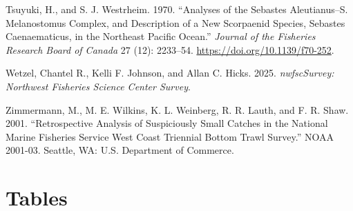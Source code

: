 \documentclass[
]{scrartcl}
\newlength{\cslhangindent}
\newenvironment{CSLReferences}[2] %
 {\begin{list}{}{%
  \setlength{\itemindent}{0pt}
  \setlength{\leftmargin}{0pt}
  \setlength{\parsep}{0pt}
  \ifodd #1
   \setlength{\leftmargin}{\cslhangindent}
   \setlength{\itemindent}{-1\cslhangindent}
  \fi
  \setlength{\itemsep}{#2\baselineskip}}}
 {\end{list}}
\begin{document}
\begin{CSLReferences}{1}{0}
Tsuyuki, H., and S. J. Westrheim. 1970. {``Analyses of the {Sebastes}
Aleutianus--{S}. Melanostomus {Complex}, and {Description} of a New
{Scorpaenid} {Species}, {Sebastes} Caenaematicus, in the {Northeast}
{Pacific} {Ocean}.''} \emph{Journal of the Fisheries Research Board of
Canada} 27 (12): 2233--54. \url{https://doi.org/10.1139/f70-252}.

Wetzel, Chantel R., Kelli F. Johnson, and Allan C. Hicks. 2025.
\emph{nwfscSurvey: Northwest Fisheries Science Center Survey}.

Zimmermann, M., M. E. Wilkins, K. L. Weinberg, R. R. Lauth, and F. R.
Shaw. 2001. {``Retrospective Analysis of Suspiciously Small Catches in
the {N}ational {M}arine {F}isheries {S}ervice West Coast Triennial
Bottom Trawl Survey.''} NOAA 2001-03. Seattle, WA: {U}.{S}. Department
of Commerce.

\end{CSLReferences}

\newpage{}

\section{Tables}\label{tables}

\begingroup
\fontsize{9.0pt}{10.8pt}\selectfont
\end{document}

